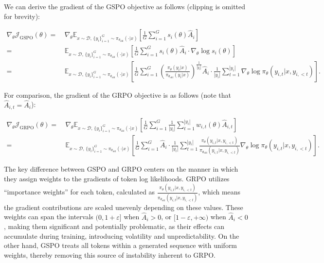 We can derive the gradient of the GSPO objective as follows (clipping is omitted for brevity):

\begin{align}
\nabla_{\theta} \mathcal{J}_\text{GSPO} (\theta)
=&\ 
\nabla_{\theta} \mathbb{E}_{ x \sim \mathcal{D},\, \{y_i\}_{i=1}^G \sim \pi_{\theta_\text{old}}( \cdot | x) }
\left[ 
\frac{1}{G} \sum_{i=1}^{G} s_{i}(\theta) \widehat{A}_{i}
\right] \\
= &\ 
\mathbb{E}_{ x \sim \mathcal{D},\, \{y_i\}_{i=1}^G \sim \pi_{\theta_\text{old}}( \cdot | x) }
\left[ 
\frac{1}{G} \sum_{i=1}^{G}
s_{i}(\theta) \widehat{A}_{i}
\cdot \nabla_{\theta} \log s_{i}(\theta)
\right] \\
=&\ 
\mathbb{E}_{ x \sim \mathcal{D},\, \{y_i\}_{i=1}^G \sim \pi_{\theta_\text{old}}( \cdot | x) }
\left[ 
\frac{1}{G} \sum_{i=1}^{G} 
\left( \frac{ \pi_{\theta} (y_i | x) }{ \pi_{\theta_\text{old}} (y_i | x)} \right)^{\frac{1}{|y_i|}} \widehat{A}_{i} 
\cdot \frac{1}{|y_i|} \sum_{t=1}^{|y_i|} \nabla_{\theta} \log \pi_{\theta} (y_{i,t} | x, y_{i,<t}) 
\right].
\label{equ:gspo_grad}
\end{align}

For comparison, the gradient of the GRPO objective is as follows (note that $\widehat{A}_{i,t} = \widehat{A}_{i}$):

\begin{align}
\nabla_{\theta} \mathcal{J}_\text{GRPO} (\theta) 
=&\ 
\nabla_{\theta} \mathbb{E}_{ x \sim \mathcal{D},\, \{y_i\}_{i=1}^G \sim \pi_{\theta_\text{old}}( \cdot | x) }
\left[ \frac{1}{G} \sum_{i=1}^{G} \frac{1}{|y_i|} \sum_{t=1}^{|y_i|} 
w_{i,t}(\theta) \widehat{A}_{i,t}
\right] \\
=&\
\mathbb{E}_{ x \sim \mathcal{D},\, \{y_i\}_{i=1}^G \sim \pi_{\theta_\text{old}}( \cdot | x) }
\left[ \frac{1}{G} \sum_{i=1}^{G} \widehat{A}_{i} 
\cdot \frac{1}{|y_i|} \sum_{t=1}^{|y_i|} 
\frac{ \pi_{\theta} (y_{i,t} | x, y_{i,<t}) }{ \pi_{\theta_\text{old}} (y_{i,t} | x,y_{i,<t})} 
\nabla_{\theta} \log \pi_{\theta} (y_{i,t} | x, y_{i,<t})  
\right].
\end{align}

The key difference between GSPO and GRPO centers on the manner in which they assign weights to the gradients of token log likelihoods. GRPO utilizes ``importance weights'' for each token, calculated as $\frac{ \pi_{\theta} (y_{i,t} | x, y_{i,<t}) }{ \pi_{\theta_\text{old}} (y_{i,t} | x,y_{i,<t})}$, which means the gradient contributions are scaled unevenly depending on these values. These weights can span the intervals $(0, 1+\varepsilon]$ when $\widehat{A}_{i} >0$, or $[1-\varepsilon, +\infty)$ when $\widehat{A}_{i} < 0$, making them significant and potentially problematic, as their effects can accumulate during training, introducing volatility and unpredictability. On the other hand, GSPO treats all tokens within a generated sequence with uniform weights, thereby removing this source of instability inherent to GRPO.

